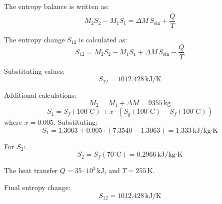 The entropy balance is written as:  
\[
M_2 S_2 - M_1 S_1 = \Delta M \, S_{\text{ein}} + \frac{\dot{Q}}{T}
\]  

The entropy change \( S_{12} \) is calculated as:  
\[
S_{12} = M_2 S_2 - M_1 S_1 + \Delta M \, S_{\text{ein}} - \frac{Q}{T}
\]  

Substituting values:  
\[
S_{12} = 1012.428 \, \text{kJ/K}
\]  

Additional calculations:  
\[
M_2 = M_1 + \Delta M = 9355 \, \text{kg}
\]  
\[
S_1 = S_f(100^\circ\text{C}) + x \cdot (S_g(100^\circ\text{C}) - S_f(100^\circ\text{C}))
\]  
where \( x = 0.005 \). Substituting:  
\[
S_1 = 1.3063 + 0.005 \cdot (7.3540 - 1.3063) = 1.333 \, \text{kJ/kg·K}
\]  

For \( S_2 \):  
\[
S_2 = S_f(70^\circ\text{C}) = 0.2966 \, \text{kJ/kg·K}
\]  

The heat transfer \( Q = 35 \cdot 10^3 \, \text{kJ} \), and \( T = 255 \, \text{K} \).  

Final entropy change:  
\[
S_{12} = 1012.428 \, \text{kJ/K}
\]